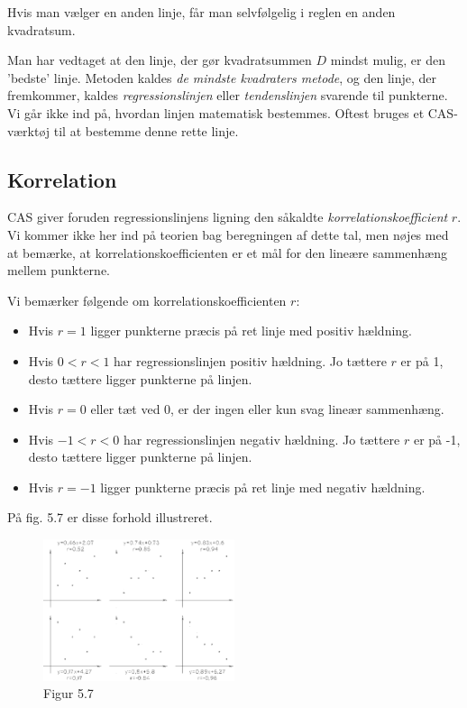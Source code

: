 \documentclass[12pt,oneside,a4paper]{article}
\begin{document}
Hvis man vælger en anden linje, får man selvfølgelig i reglen en anden kvadratsum.

Man har vedtaget at den linje, der gør kvadratsummen $D$ mindst mulig, er den
'bedste' linje. Metoden kaldes {\em de mindste kvadraters metode}, og den linje, der
fremkommer, kaldes {\em regressionslinjen} eller {\em tendenslinjen} svarende
til punkterne. Vi går ikke ind på, hvordan linjen matematisk bestemmes. 
Oftest bruges et CAS-værktøj til at bestemme denne rette linje.

\subsection{Korrelation}
CAS giver foruden regressionslinjens ligning den såkaldte {\em
korrelations\-koef\-fi\-cient} $r$. Vi kommer ikke her ind på teorien bag
beregningen af dette tal, men nøjes med at bemærke, at
korrelationskoefficienten er et mål for den lineære sammenhæng mellem
punkterne.

Vi bemærker følgende om korrelationskoefficienten $r$:

\begin{itemize}
    \item Hvis $r = 1$ ligger punkterne præcis på ret linje med positiv hældning.
    \item Hvis $0 < r < 1$ har regressionslinjen positiv hældning. Jo tættere $r$
        er på 1, desto tættere ligger punkterne på linjen.
    \item Hvis $r = 0$ eller tæt ved 0, er der ingen eller kun svag lineær sammenhæng.
    \item Hvis $-1 < r < 0$ har regressionslinjen negativ hældning. Jo tættere $r$
        er på -1, desto tættere ligger punkterne på linjen.
    \item Hvis $r = -1$ ligger punkterne præcis på ret linje med negativ hældning. 
\end{itemize}
På fig. 5.7 er disse forhold illustreret.

\begin{figure}[H]
    \centering
    \includegraphics[width=0.5\textwidth]{fig57}
    \caption{Figur 5.7}
    \label{fig57}
\end{figure}
\end{document}
